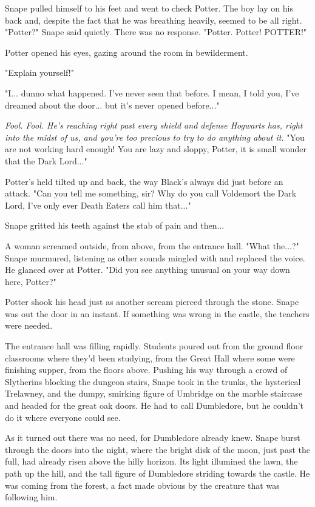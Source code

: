 Snape pulled himself to his feet and went to check Potter. The boy lay on his back and, despite the fact that he was breathing heavily, seemed to be all right. "Potter?" Snape said quietly. There was no response. "Potter. Potter! POTTER!"

Potter opened his eyes, gazing around the room in bewilderment.

"Explain yourself!"

"I... dunno what happened. I've never seen that before. I mean, I told you, I've dreamed about the door... but it's never opened before..."

\emph{Fool. Fool. He's reaching right past every shield and defense Hogwarts has, right into the midst of us, and you're too precious to try to do anything about it.} "You are not working hard enough! You are lazy and sloppy, Potter, it is small wonder that the Dark Lord..."

Potter's held tilted up and back, the way Black's always did just before an attack. "Can you tell me something, sir? Why do you call Voldemort the Dark Lord, I've only ever Death Eaters call him that..."

Snape gritted his teeth against the stab of pain and then...

A woman screamed outside, from above, from the entrance hall. "What the...?" Snape murmured, listening as other sounds mingled with and replaced the voice. He glanced over at Potter. "Did you see anything unusual on your way down here, Potter?"

Potter shook his head just as another scream pierced through the stone. Snape was out the door in an instant. If something was wrong in the castle, the teachers were needed.

The entrance hall was filling rapidly. Students poured out from the ground floor classrooms where they'd been studying, from the Great Hall where some were finishing supper, from the floors above. Pushing his way through a crowd of Slytherins blocking the dungeon stairs, Snape took in the trunks, the hysterical Trelawney, and the dumpy, smirking figure of Umbridge on the marble staircase and headed for the great oak doors. He had to call Dumbledore, but he couldn't do it where everyone could see.

As it turned out there was no need, for Dumbledore already knew. Snape burst through the doors into the night, where the bright disk of the moon, just past the full, had already risen above the hilly horizon. Its light illumined the lawn, the path up the hill, and the tall figure of Dumbledore striding towards the castle. He was coming from the forest, a fact made obvious by the creature that was following him.

